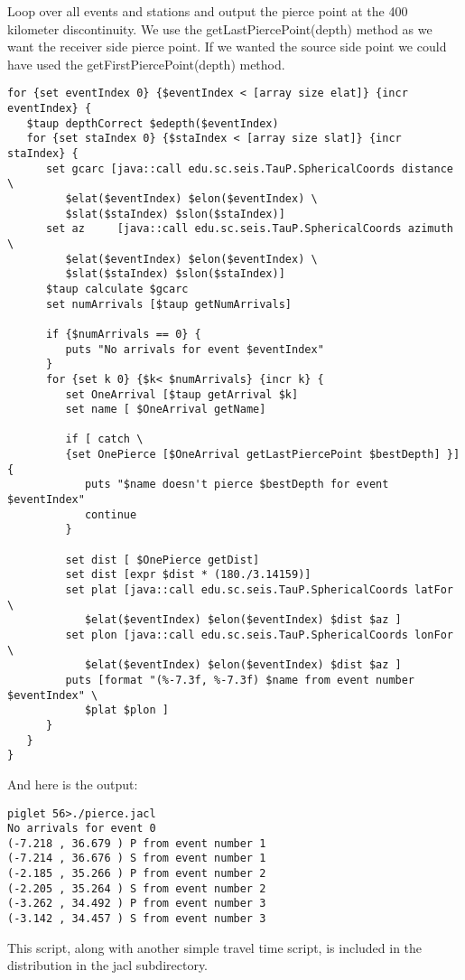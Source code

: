 Loop over all events and stations and output the pierce point at the 400 
kilometer discontinuity. We use the getLastPiercePoint(depth) method as
we want the receiver side pierce point. If we wanted the source side point
we could have used the getFirstPiercePoint(depth) method.
\begin{verbatim}
for {set eventIndex 0} {$eventIndex < [array size elat]} {incr eventIndex} {
   $taup depthCorrect $edepth($eventIndex)
   for {set staIndex 0} {$staIndex < [array size slat]} {incr staIndex} {
      set gcarc [java::call edu.sc.seis.TauP.SphericalCoords distance \
         $elat($eventIndex) $elon($eventIndex) \
         $slat($staIndex) $slon($staIndex)]
      set az     [java::call edu.sc.seis.TauP.SphericalCoords azimuth \
         $elat($eventIndex) $elon($eventIndex) \
         $slat($staIndex) $slon($staIndex)]
      $taup calculate $gcarc
      set numArrivals [$taup getNumArrivals]

      if {$numArrivals == 0} {
         puts "No arrivals for event $eventIndex"
      }
      for {set k 0} {$k< $numArrivals} {incr k} {
         set OneArrival [$taup getArrival $k]
         set name [ $OneArrival getName]

         if [ catch \
         {set OnePierce [$OneArrival getLastPiercePoint $bestDepth] }] {
            puts "$name doesn't pierce $bestDepth for event $eventIndex"
            continue
         }

         set dist [ $OnePierce getDist]
         set dist [expr $dist * (180./3.14159)]
         set plat [java::call edu.sc.seis.TauP.SphericalCoords latFor \
            $elat($eventIndex) $elon($eventIndex) $dist $az ]
         set plon [java::call edu.sc.seis.TauP.SphericalCoords lonFor \
            $elat($eventIndex) $elon($eventIndex) $dist $az ]
         puts [format "(%-7.3f, %-7.3f) $name from event number $eventIndex" \
            $plat $plon ]
      }
   }
}
\end{verbatim}

And here is the output:
\begin{verbatim}
piglet 56>./pierce.jacl
No arrivals for event 0
(-7.218 , 36.679 ) P from event number 1
(-7.214 , 36.676 ) S from event number 1
(-2.185 , 35.266 ) P from event number 2
(-2.205 , 35.264 ) S from event number 2
(-3.262 , 34.492 ) P from event number 3
(-3.142 , 34.457 ) S from event number 3
\end{verbatim}

This script, along with another simple travel time script, is included in the
distribution in the jacl subdirectory.

